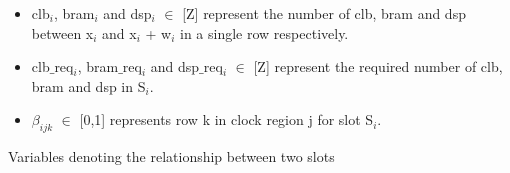 \documentclass[conference]{IEEEtran}
\begin{document}
\begin{itemize}
\item clb$_i$, bram$_i$ and dsp$_i$  $\in$ [Z] represent the number of clb, bram and dsp between x$_i$ and x$_i$ + w$_i$ in a single row respectively.
\end{itemize}

\begin{itemize}
\item clb$\_$req$_i$, bram$\_$req$_i$ and dsp$\_$req$_i$  $\in$ [Z] represent the required number of clb, bram and dsp in S$_i$.
\end{itemize}

\begin{itemize}
\item $\beta_{ijk}$ $\in$ [0,1] represents row k in clock region j for slot S$_i$.
\end{itemize}
\hfill \break
Variables denoting the relationship between two slots 
\end{document}
